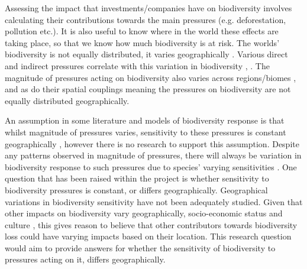 \documentclass[11pt, a4paper, titlepage]{article}
\begin{document}
   	 Assessing the impact that investments/companies have on biodiversity involves calculating their contributions towards the main pressures (e.g. deforestation, pollution etc.). It is also useful to know where in the world these effects are taking place, so that we know how much biodiversity is at risk. The worlds' biodiversity is not equally distributed, it varies geographically \citep{gaston2000global} \citep{ricklefs2004comprehensive} \citep{mcrae2017diversity}. Various direct and indirect pressures correlate with this variation in biodiversity \citep{sunday2015species}, \citep{ament2019compatibility} \citep{Velde2022}. The magnitude of pressures acting on biodiversity also varies across regions/biomes \citep{millennium2005ecosystems} \citep{sala2000global}, and as do their spatial couplings \citep{bowler2020mapping} meaning the pressures on biodiversity are not equally distributed geographically. \newline
   	 
   	 An assumption in some literature and models of biodiversity response is that whilst magnitude of pressures varies, sensitivity to these pressures is constant geographically \citep{sala2000global}, however there is no research to support this assumption. Despite any patterns observed in magnitude of pressures, there will always be variation in biodiversity response to such pressures due to species' varying sensitivities \citep{bowler2020mapping}. One question that has been raised within the project is whether sensitivity to biodiversity pressures is constant, or differs geographically. Geographical variations in biodiversity sensitivity have not been adequately studied. Given that other impacts on biodiversity vary geographically, socio-economic status and culture  \citep{kinzig2005effects}, this gives reason to believe that other contributors towards biodiversity loss could have varying impacts based on their location. This research question would aim to provide answers for whether the sensitivity of biodiversity to pressures acting on it, differs geographically. \newline
   	 
\end{document}
